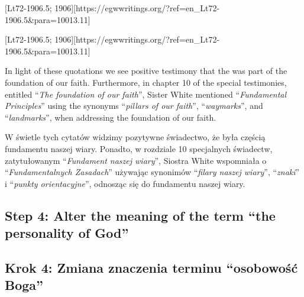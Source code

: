 [Lt72-1906.5; 1906][https://egwwritings.org/?ref=en\_Lt72-1906.5&para=10013.11]


[Lt72-1906.5; 1906][https://egwwritings.org/?ref=en\_Lt72-1906.5&para=10013.11]


In light of these quotations we see positive testimony that the  was part of the foundation of our faith. Furthermore, in chapter 10 of the special testimonies, entitled “\textit{The foundation of our faith}”, Sister White mentioned “\textit{Fundamental Principles}” using the synonyms “\textit{pillars of our faith}”, “\textit{waymarks}”, and “\textit{landmarks}”, when addressing the foundation of our faith.


W świetle tych cytatów widzimy pozytywne świadectwo, że  była częścią fundamentu naszej wiary. Ponadto, w rozdziale 10 specjalnych świadectw, zatytułowanym “\textit{Fundament naszej wiary}”, Siostra White wspomniała o “\textit{Fundamentalnych Zasadach}” używając synonimów “\textit{filary naszej wiary}”, “\textit{znaki}” i “\textit{punkty orientacyjne}”, odnosząc się do fundamentu naszej wiary.


\subsection*{Step 4: Alter the meaning of the term “the personality of God”}


\subsection*{Krok 4: Zmiana znaczenia terminu “osobowość Boga”}



